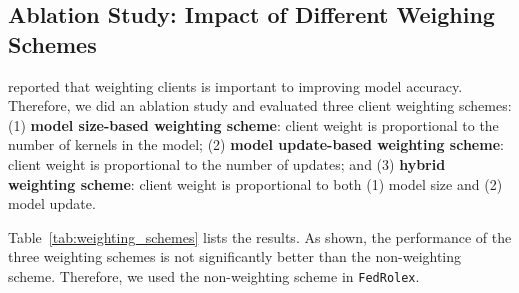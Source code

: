 \documentclass{article}
\begin{document}
\subsection{Ablation Study: Impact of Different Weighing Schemes}
\label{app:weighting_schemes}
\citep{cho2022heterogeneous} reported that weighting clients is important to improving model accuracy. Therefore, we did an ablation study and evaluated three client weighting schemes: (1) \textbf{model size-based weighting scheme}: client weight is proportional to the number of kernels in the model; (2) \textbf{model update-based weighting scheme}: client weight is proportional to the number of updates; and (3) \textbf{hybrid weighting scheme}: client weight is proportional to both (1) model size and (2) model update. 
%

Table~\ref{tab:weighting_schemes} lists the results. As shown, the performance of the three weighting schemes is not significantly better than the non-weighting scheme. 
Therefore, we used the non-weighting scheme in \texttt{FedRolex}.





\begin{table}[!h]
\centering
\caption{Impact of weighting schemes on model accuracy under high data heterogeneity.}
\label{tab:weighting_schemes}
\end{table}
\end{document}
